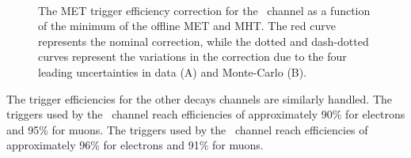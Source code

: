 \begin{figure}[htbp]
  \centering
  \mbox{
     \quad
     \quad
  }
  \caption[2017 MET Trigger Efficiency Correction for \ZnnHbb]{The MET trigger efficiency correction for the \ZnnHbb\ channel as a function of the minimum of the offline MET and MHT. The red curve represents the nominal correction, while the dotted and dash-dotted curves represent the variations in the correction due to the four leading uncertainties in data (A) and Monte-Carlo (B).}
    \label{fig:triggersunc}
\end{figure}

The trigger efficiencies for the other decays channels are similarly handled. The triggers used by the \WlnH\ channel reach efficiencies of approximately 90\% for electrons and 95\% for muons. The triggers used by the \ZllH\ channel reach efficiencies of approximately 96\% for electrons and 91\% for muons.

